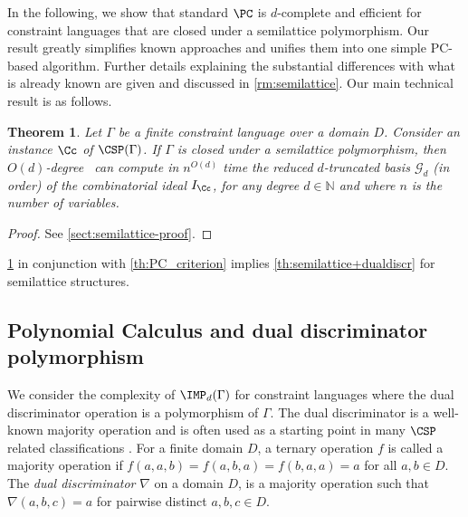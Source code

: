 \documentclass[11pt]{article}
\newtheorem{theorem}{Theorem}[section]
\begin{document}
In the following, we show that standard $\PC$ is $d$-complete and efficient for constraint languages that are closed under a semilattice polymorphism. Our result greatly simplifies known approaches \cite{BulatovRSTOC22, Mastrolilli21TALG} and unifies them into one simple
PC-based algorithm. Further details explaining the substantial differences with what is already known are given and discussed in \cref{rm:semilattice}. 
%
Our main technical result is as follows.
\begin{theorem}\label{th:semilattice}
Let $\Gamma$ be a finite constraint language over a domain $D$. Consider an instance $\Cc$ of $\CSP(\Gamma)$. If $\Gamma$ is closed under a semilattice polymorphism, then $O(d)$-degree \PC\  can compute in $n^{O(d)}$ time the reduced $d$-truncated \GB basis $\mathcal{G}_d$ (in \grlex order) of the combinatorial ideal $I_\Cc$, for any degree $d \in \mathbb{N}$ and where $n$ is the number of variables.
\end{theorem}
\begin{proof}
    See \cref{sect:semilattice-proof}.
\end{proof}
%
%
\cref{th:semilattice} in conjunction with \cref{th:PC_criterion} implies \cref{th:semilattice+dualdiscr} for semilattice structures.
%

\subsection{Polynomial Calculus and dual discriminator polymorphism}\label{sect:PCdual}
We consider the complexity of $\IMP_d(\Gamma)$ for constraint languages where the dual discriminator operation is a polymorphism of $\Gamma$. 
The dual discriminator is a well-known majority operation \cite{Jeavons:1997:CPC,barto_et_al:DFU:2017:6959} and is often used as a starting point in many $\CSP$ related classifications \cite{barto_et_al:DFU:2017:6959}. For a finite domain $D$, a ternary operation $f$ is called a majority operation if  $f(a,a,b)=f(a,b,a)=f(b,a,a)=a$ for all $a,b\in D$. The \emph{dual discriminator} $\nabla$ on a domain $D$, is a majority operation such that $\nabla(a,b,c)=a$ for pairwise distinct $a,b,c\in D$.
\end{document}
